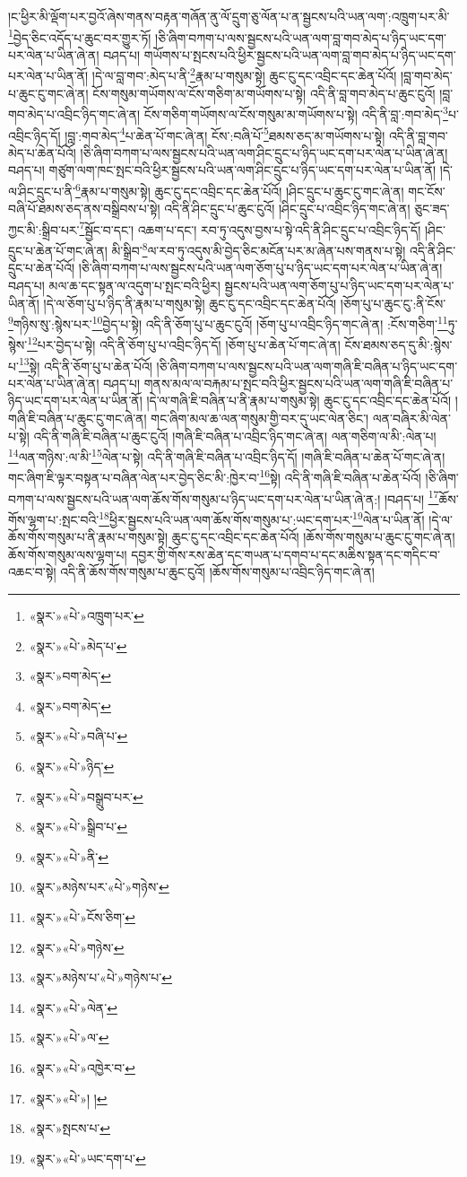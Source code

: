 །ང་ཕྱིར་མི་ལྡོག་པར་བྱའོ་ཞེས་གནས་བརྟན་གཞོན་ནུ་ལོ་དྲུག་ཅུ་ལོན་པ་ན་སྦྱངས་པའི་ཡན་ལག་:འཁྲུག་པར་མི་\footnote{«སྣར་»«པེ་»འཁྲུག་པར་}བྱེད་ཅིང་འདོད་པ་ཆུང་བར་གྱུར་ཏོ། །ཅི་ཞིག་བཀག་པ་ལས་སྦྱངས་པའི་ཡན་ལག་བླ་གབ་མེད་པ་ཉིད་ཡང་དག་པར་ལེན་པ་ཡིན་ཞེ་ན། བཤད་པ། གཡོགས་པ་སྤངས་པའི་ཕྱིར་སྦྱངས་པའི་ཡན་ལག་བླ་གབ་མེད་པ་ཉིད་ཡང་དག་པར་ལེན་པ་ཡིན་ནོ། །དེ་ལ་བླ་གབ་:མེད་པ་ནི་\footnote{«སྣར་»«པེ་»མེད་པ་}རྣམ་པ་གསུམ་སྟེ། ཆུང་ངུ་དང་འབྲིང་དང་ཆེན་པོའོ། །བླ་གབ་མེད་པ་ཆུང་ངུ་གང་ཞེ་ན། ངོས་གསུམ་གཡོགས་ལ་ངོས་གཅིག་མ་གཡོགས་པ་སྟེ། འདི་ནི་བླ་གབ་མེད་པ་ཆུང་ངུའོ། །བླ་གབ་མེད་པ་འབྲིང་ཉིད་གང་ཞེ་ན། ངོས་གཅིག་གཡོགས་ལ་ངོས་གསུམ་མ་གཡོགས་པ་སྟེ། འདི་ནི་བླ་:གབ་མེད་\footnote{«སྣར་»བག་མེད་}པ་འབྲིང་ཉིད་དོ། །བླ་:གབ་མེད་\footnote{«སྣར་»བག་མེད་}པ་ཆེན་པོ་གང་ཞེ་ན། ངོས་:བཞི་པོ་\footnote{«སྣར་»«པེ་»བཞི་པ་}ཐམས་ཅད་མ་གཡོགས་པ་སྟེ། འདི་ནི་བླ་གབ་མེད་པ་ཆེན་པོའོ། །ཅི་ཞིག་བཀག་པ་ལས་སྦྱངས་པའི་ཡན་ལག་ཤིང་དྲུང་པ་ཉིད་ཡང་དག་པར་ལེན་པ་ཡིན་ཞེ་ན། བཤད་པ། གཙུག་ལག་ཁང་སྤང་བའི་ཕྱིར་སྦྱངས་པའི་ཡན་ལག་ཤིང་དྲུང་པ་ཉིད་ཡང་དག་པར་ལེན་པ་ཡིན་ནོ། །དེ་ལ་ཤིང་དྲུང་པ་ནི་\footnote{«སྣར་»«པེ་»ཉིད་}རྣམ་པ་གསུམ་སྟེ། ཆུང་ངུ་དང་འབྲིང་དང་ཆེན་པོའོ། །ཤིང་དྲུང་པ་ཆུང་ངུ་གང་ཞེ་ན། གང་ངོས་བཞི་པོ་ཐམས་ཅད་ནས་བསྒྲིབས་པ་སྟེ། འདི་ནི་ཤིང་དྲུང་པ་ཆུང་ངུའོ། །ཤིང་དྲུང་པ་འབྲིང་ཉིད་གང་ཞེ་ན། ཅུང་ཟད་ཀྱང་མི་:སྒྲིབ་པར་\footnote{«སྣར་»«པེ་»བསྒྲུབ་པར་}སྦྱོང་བ་དང་། འཆག་པ་དང་། རབ་ཏུ་འདུས་བྱས་པ་སྟེ་འདི་ནི་ཤིང་དྲུང་པ་འབྲིང་ཉིད་དོ། །ཤིང་དྲུང་པ་ཆེན་པོ་གང་ཞེ་ན། མི་སྒྲིབ་\footnote{«སྣར་»«པེ་»སྒྲིབ་པ་}ལ་རབ་ཏུ་འདུས་མི་བྱེད་ཅིང་མངོན་པར་མ་ཞེན་པས་གནས་པ་སྟེ། འདི་ནི་ཤིང་དྲུང་པ་ཆེན་པོའོ། །ཅི་ཞིག་བཀག་པ་ལས་སྦྱངས་པའི་ཡན་ལག་ཅོག་པུ་པ་ཉིད་ཡང་དག་པར་ལེན་པ་ཡིན་ཞེ་ན། བཤད་པ། མལ་ཆ་དང་སྟན་ལ་འདུག་པ་སྤང་བའི་ཕྱིར། སྦྱངས་པའི་ཡན་ལག་ཅོག་པུ་པ་ཉིད་ཡང་དག་པར་ལེན་པ་ཡིན་ནོ། །དེ་ལ་ཅོག་པུ་པ་ཉིད་ནི་རྣམ་པ་གསུམ་སྟེ། ཆུང་ངུ་དང་འབྲིང་དང་ཆེན་པོའོ། །ཅོག་པུ་པ་ཆུང་ངུ་:ནི་ངོས་\footnote{«སྣར་»«པེ་»ནི་}གཉིས་སུ་:སྙེས་པར་\footnote{«སྣར་»མཉེས་པར་«པེ་»གཉེས་}བྱེད་པ་སྟེ། འདི་ནི་ཅོག་པུ་པ་ཆུང་ངུའོ། །ཅོག་པུ་པ་འབྲིང་ཉིད་གང་ཞེ་ན། :ངོས་གཅིག་\footnote{«སྣར་»«པེ་»ངོས་ཅིག་}ཏུ་སྙེས་\footnote{«སྣར་»«པེ་»གཉེས་}པར་བྱེད་པ་སྟེ། འདི་ནི་ཅོག་པུ་པ་འབྲིང་ཉིད་དོ། །ཅོག་པུ་པ་ཆེན་པོ་གང་ཞེ་ན། ངོས་ཐམས་ཅད་དུ་མི་:སྙེས་པ་\footnote{«སྣར་»མཉེས་པ་«པེ་»གཉེས་པ་}སྟེ། འདི་ནི་ཅོག་པུ་པ་ཆེན་པོའོ། །ཅི་ཞིག་བཀག་པ་ལས་སྦྱངས་པའི་ཡན་ལག་གཞི་ཇི་བཞིན་པ་ཉིད་ཡང་དག་པར་ལེན་པ་ཡིན་ཞེ་ན། བཤད་པ། གནས་མལ་ལ་བརྐམ་པ་སྤང་བའི་ཕྱིར་སྦྱངས་པའི་ཡན་ལག་གཞི་ཇི་བཞིན་པ་ཉིད་ཡང་དག་པར་ལེན་པ་ཡིན་ནོ། །དེ་ལ་གཞི་ཇི་བཞིན་པ་ནི་རྣམ་པ་གསུམ་སྟེ། ཆུང་ངུ་དང་འབྲིང་དང་ཆེན་པོའོ། །གཞི་ཇི་བཞིན་པ་ཆུང་ངུ་གང་ཞེ་ན། གང་ཞིག་མལ་ཆ་ལན་གསུམ་གྱི་བར་དུ་ཡང་ལེན་ཅིང་། ལན་བཞིར་མི་ལེན་པ་སྟེ། འདི་ནི་གཞི་ཇི་བཞིན་པ་ཆུང་ངུའོ། །གཞི་ཇི་བཞིན་པ་འབྲིང་ཉིད་གང་ཞེ་ན། ལན་གཅིག་ལ་མི་:ལེན་པ། \footnote{«སྣར་»«པེ་»ལེན་}ལན་གཉིས་:ལ་མི་\footnote{«སྣར་»«པེ་»ལ་}ལེན་པ་སྟེ། འདི་ནི་གཞི་ཇི་བཞིན་པ་འབྲིང་ཉིད་དོ། །གཞི་ཇི་བཞིན་པ་ཆེན་པོ་གང་ཞེ་ན། གང་ཞིག་ཇི་ལྟར་བསྟན་པ་བཞིན་ལེན་པར་བྱེད་ཅིང་མི་:ཁྱེར་བ་\footnote{«སྣར་»«པེ་»འཁྱེར་བ་}སྟེ། འདི་ནི་གཞི་ཇི་བཞིན་པ་ཆེན་པོའོ། །ཅི་ཞིག་བཀག་པ་ལས་སྦྱངས་པའི་ཡན་ལག་ཆོས་གོས་གསུམ་པ་ཉིད་ཡང་དག་པར་ལེན་པ་ཡིན་ཞེ་ན:། །བཤད་པ། \footnote{«སྣར་»«པེ་»། ། }ཆོས་གོས་ལྷག་པ་:སྤང་བའི་\footnote{«སྣར་»སྤངས་པ་}ཕྱིར་སྦྱངས་པའི་ཡན་ལག་ཆོས་གོས་གསུམ་པ་:ཡང་དག་པར་\footnote{«སྣར་»«པེ་»ཡང་དག་པ་}ལེན་པ་ཡིན་ནོ། །དེ་ལ་ཆོས་གོས་གསུམ་པ་ནི་རྣམ་པ་གསུམ་སྟེ། ཆུང་ངུ་དང་འབྲིང་དང་ཆེན་པོའོ། །ཆོས་གོས་གསུམ་པ་ཆུང་ངུ་གང་ཞེ་ན། ཆོས་གོས་གསུམ་ལས་ལྷག་པ། དབྱར་གྱི་གོས་རས་ཆེན་དང་གཡན་པ་དགབ་པ་དང་མཆིས་སྟན་དང་གདིང་བ་འཆང་བ་སྟེ། འདི་ནི་ཆོས་གོས་གསུམ་པ་ཆུང་ངུའོ། །ཆོས་གོས་གསུམ་པ་འབྲིང་ཉིད་གང་ཞེ་ན། 